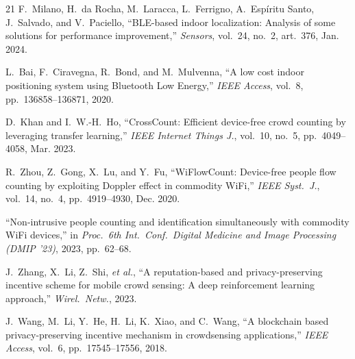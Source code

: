 \documentclass[journal,10pt]{IEEEtran}
\begin{document}
\begin{thebibliography}{21}
 F.~Milano, H.~da Rocha, M.~Laracca, L.~Ferrigno, A.~Esp\'iritu Santo, J.~Salvado, and V.~Paciello, ``BLE-based indoor localization: Analysis of some solutions for performance improvement,'' \emph{Sensors}, vol.~24, no.~2, art.~376, Jan. 2024.

 L.~Bai, F.~Ciravegna, R.~Bond, and M.~Mulvenna, ``A low cost indoor positioning system using Bluetooth Low Energy,'' \emph{IEEE Access}, vol.~8, pp.~136858--136871, 2020.

 D.~Khan and I.~W.-H.~Ho, ``CrossCount: Efficient device-free crowd counting by leveraging transfer learning,'' \emph{IEEE Internet Things J.}, vol.~10, no.~5, pp.~4049--4058, Mar. 2023.

 R.~Zhou, Z.~Gong, X.~Lu, and Y.~Fu, ``WiFlowCount: Device-free people flow counting by exploiting Doppler effect in commodity WiFi,'' \emph{IEEE Syst.~J.}, vol.~14, no.~4, pp.~4919--4930, Dec. 2020.

 ``Non-intrusive people counting and identification simultaneously with commodity WiFi devices,'' in \emph{Proc.\ 6th Int.\ Conf.\ Digital Medicine and Image Processing (DMIP '23)}, 2023, pp.~62--68.

 J.~Zhang, X.~Li, Z.~Shi, \emph{et al.}, ``A reputation-based and privacy-preserving incentive scheme for mobile crowd sensing: A deep reinforcement learning approach,'' \emph{Wirel.\ Netw.}, 2023.

 J.~Wang, M.~Li, Y.~He, H.~Li, K.~Xiao, and C.~Wang, ``A blockchain based privacy-preserving incentive mechanism in crowdsensing applications,'' \emph{IEEE Access}, vol.~6, pp.~17545--17556, 2018.

\end{thebibliography}
\end{document}
